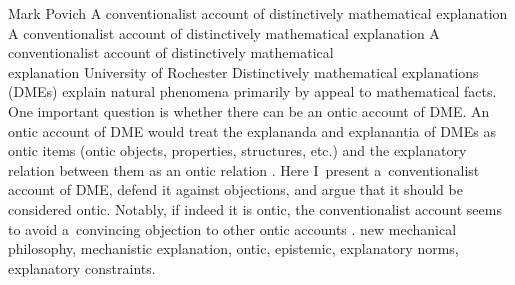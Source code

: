 \begin{artengenv}{Mark Povich}
	{A conventionalist account of distinctively mathematical explanation}
	{A conventionalist account of distinctively mathematical explanation}
	{A conventionalist account of distinctively mathematical\\explanation}
	{University of Rochester}
	{Distinctively mathematical explanations (DMEs) explain natural phenomena primarily by appeal to mathematical facts. One important question is whether there can be an ontic account of DME. An ontic account of DME would treat the explananda and explanantia of DMEs as ontic items (ontic objects, properties, structures, etc.) and the explanatory relation between them as an ontic relation
	\parencites[e.g.,][]{pincock_abstract_2015}[][]{povich_narrow_2021}.
	 Here I~present a~conventionalist account of DME, defend it against objections, and argue that it should be considered ontic. Notably, if indeed it is ontic, the conventionalist account seems to avoid a~convincing objection to other ontic accounts 
	\parencite[][]{kuorikoski_there_2021}.%
	}
	{new mechanical philosophy, mechanistic explanation, ontic, epistemic, explanatory norms, explanatory constraints.}





\end{artengenv}
